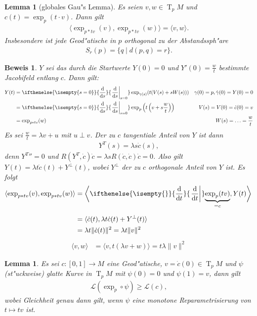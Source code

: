 \documentclass[paper=A4, twoside, chapterprefix=true, bibliography=totoc, headsepline]{scrbook}
\DeclareMathOperator{\T}{T} %
\newcommand{\dop}{\mathrm{d}}
\newcommand{\difffrac}[3][]{\ifthenelse{\isempty{#1}}{\frac{\dop #2}{\dop #3}}{\left. \frac{\dop #2}{\dop #3} \right|_{#1}}}
\theoremstyle{plain}
\newtheorem{Lemma}[Dfn]{Lemma}
\theoremstyle{nonumberplain}
\newtheorem{bew}{Beweis}
\theoremstyle{empty}
\theoremstyle{break}
\begin{document}
\begin{Lemma}[globales Gau"s Lemma]
  Es seien $v, w \in \T_pM$ und $c(t) = \exp_p(t \cdot v)$.
  Dann gilt
  \begin{align*}
    \langle \exp_{p*tv}(v), \exp_{p*tv}(w) \rangle = \langle v, w \rangle.
  \end{align*}
  Insbesondere ist jede Geod"atische in $p$ orthogonal zu der Abstandssph"are
  \begin{align*}
    S_r(p) = \{ q \mid d(p, q) = r \}.
  \end{align*}
\end{Lemma}

\begin{bew}
  $Y$ sei das durch die Startwerte $Y(0) = 0$ und $Y'(0) = \frac{w}{t}$ bestimmte Jacobifeld entlang $c$.
  Dann gilt:
  \begin{align*}
    Y(t) &= \difffrac[s=0]{}{s} \exp_{\gamma(s)}(t(V(s) + sW(s))) & \gamma(0) = p, \dot\gamma(0) = Y(0) = 0\\
    &= \difffrac[s=0]{}{s} \exp_p\left(t \left(v + s \frac{w}{t}\right)\right) & V(s) = V(0) = \dot c(0) = v\\
    &= \exp_{p*tv}(w) & W(s) = \ldots = \frac{w}{t}
  \end{align*}
  Es sei $\frac{w}{t} = \lambda v + u$ mit $u \perp v$.
  Der zu $c$ tangentiale Anteil von $Y$ ist dann
  \begin{align*}
    Y^T(s) = \lambda s \dot c (s),
  \end{align*}
  denn ${Y^T}{''} = 0$ und $R(Y^T, \dot c) \dot c = \lambda s R(\dot c, \dot c) \dot c = 0$.
  Also gilt $Y(t) = \lambda t \dot c(t) + Y^\perp(t)$, wobei $Y^\perp$ der zu $c$ orthogonale Anteil von $Y$ ist. Es folgt
  \begin{align*}
    \langle \exp_{p*tv}(v), \exp_{p*tv}(w) \rangle &= \left\langle \difffrac{}{t} \smash{\underbrace{\exp_p(tv)}_{=c}}, Y(t) \right\rangle \vphantom{\underbrace{\difffrac{}{}}_{a}} \\
    &= \langle \dot c(t), \lambda t \dot c(t) + Y^\perp(t) \rangle \\
    &= \lambda t \|\dot c(t) \|^2 = \lambda t \|v\|^2 \\
  \end{align*}
  \begin{align*}
    \langle v, w \rangle &= \langle v, t(\lambda v + w) \rangle = t \lambda \|v\|^2
  \end{align*}
\end{bew}

\begin{Lemma}\label{thm:lemma-9-10}
  Es sei $c \colon [0,1] \to M$ eine Geod"atische, $v = \dot c(0) \in \T_{p}M$ und $\psi$ (st"uckweise) glatte Kurve in $\T_pM$ mit $\psi(0) = 0$ und $\psi(1) = v$, dann gilt
  \begin{align*}
    \mathcal L(\exp_p \circ \psi) \geq \mathcal L(c),
  \end{align*}
  wobei Gleichheit genau dann gilt, wenn $\psi$ eine monotone Reparametrisierung von $t \mapsto tv$ ist.
\end{Lemma}
\end{document}

